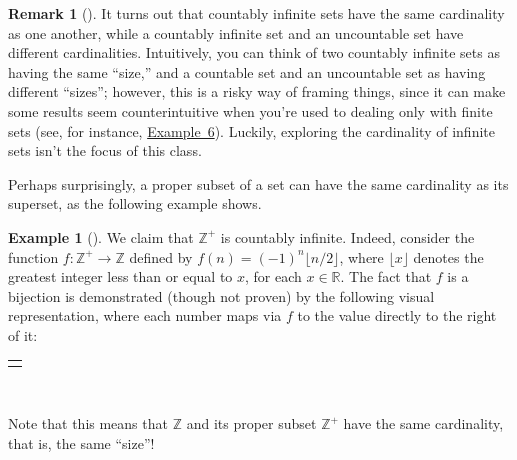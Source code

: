 \documentclass[10pt,openany,oneside]{book}
\theoremstyle{plain}
\theoremstyle{definition}
\theoremstyle{definition}
\newtheorem{remark}[theorem]{Remark}
\theoremstyle{definition}
\newtheorem{example}[theorem]{Example}
\theoremstyle{definition}
\numberwithin{equation}{section}
\newlength{\panelmax}
\def\Z{\mathbb{Z}}
\def\R{\mathbb{R}}
\begin{document}
\begin{remark}[]\label{remark-3}
It turns out that countably infinite sets have the same cardinality as one another, while a countably infinite set and an uncountable set have different cardinalities. Intuitively, you  can think  of two countably infinite sets as having the same ``size,'' and a countable set and an uncountable set as having different ``sizes''; however, this is a risky way of framing things, since it can  make some results seem counterintuitive when you're used to dealing only with finite sets (see, for instance, \hyperref[zplus]{Example~6}).  Luckily, exploring the cardinality of infinite sets isn't the focus of this class.%
\end{remark}
Perhaps surprisingly, a proper subset of a set can have the same cardinality as its superset, as the following example shows.%
\begin{example}[]\label{zplus}
We claim that \(\Z^+\) is countably infinite. Indeed, consider the function \(f:\Z^+ \to \Z\) defined by \(f(n)=(-1)^n \lfloor n/2 \rfloor\), where \(\lfloor x \rfloor\) denotes the greatest integer less than or equal to \(x\), for each \(x\in \R\). The fact that \(f\) is a bijection is demonstrated (though not proven) by the following visual representation, where each number maps via \(f\) to the value directly to the right of it:%
{%
\setlength{\panelmax}{0pt}
\newsavebox{\panelboxAtabular}
\newlength{\phAtabular}\setlength{\phAtabular}{\ht\panelboxAtabular+\dp\panelboxAtabular}
\settototalheight{\phAtabular}{\usebox{\panelboxAtabular}}
\setlength{\panelmax}{\maxof{\panelmax}{\phAtabular}}
\leavevmode%
\setlength{\tabcolsep}{0\linewidth}
\par\medskip\noindent
\begin{tabular}{@{}*{1}{c}@{}}
\begin{minipage}[c][\panelmax][t]{1\linewidth}\usebox{\panelboxAtabular}\end{minipage}\end{tabular}\\
}%
\par
Note that this means that \(\Z\) and its proper subset \(\Z^+\) have the same cardinality, that is, the same ``size''!%
\end{example}
\end{document}
